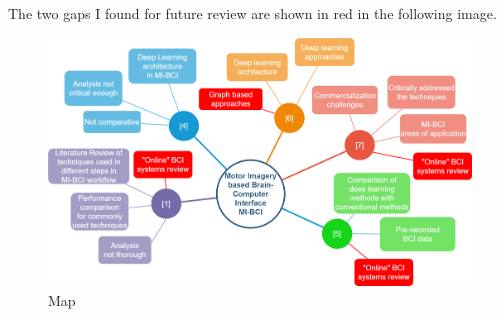 The two gaps I found for future review are shown in red in the following image. 
\begin{figure}[h]
\includegraphics[width=1\textwidth, inner]{body/map}
\caption{Map}
\label{fig:figure2}
\end{figure}

\nocite{*}